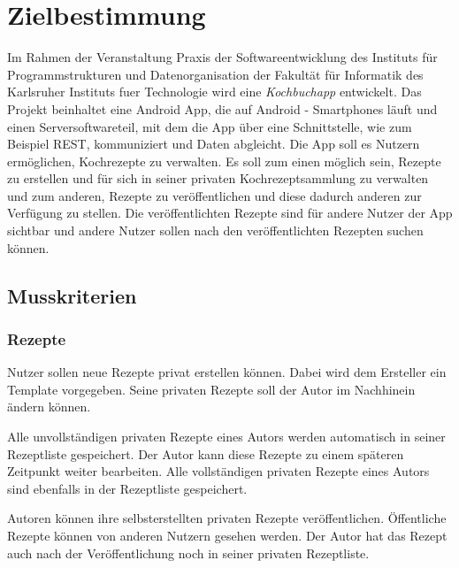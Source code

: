 \chapter{Zielbestimmung}	
	Im Rahmen der Veranstaltung \glqq Praxis der Softwareentwicklung\grqq{} des  Instituts für Programmstrukturen und Datenorganisation der Fakultät für Informatik des Karlsruher Instituts fuer Technologie wird eine \textit{Kochbuchapp} entwickelt. Das Projekt beinhaltet eine \gls{Android} App, die auf \gls{Android} - Smartphones läuft und einen Serversoftwareteil, mit dem die App über eine Schnittstelle, wie zum Beispiel \gls{REST}, kommuniziert und Daten abgleicht. Die App soll es Nutzern ermöglichen, Kochrezepte zu verwalten. Es soll zum einen möglich sein, Rezepte zu erstellen und für sich in seiner privaten Kochrezeptsammlung  zu verwalten und zum anderen, Rezepte zu veröffentlichen und diese dadurch anderen zur Verfügung zu stellen. Die veröffentlichten Rezepte sind für andere \gls{Nutzer} der App sichtbar und andere \gls{Nutzer} sollen nach den veröffentlichten Rezepten suchen können.


\section{Musskriterien}


\subsection{Rezepte}

 \gls{Nutzer} sollen neue Rezepte privat erstellen können. Dabei wird dem Ersteller ein \Gls{Template} vorgegeben. Seine privaten Rezepte soll der \gls{Autor} im Nachhinein ändern können. 

Alle unvollständigen privaten Rezepte eines Autors werden automatisch in seiner \gls{Rezeptliste} gespeichert. Der Autor kann diese Rezepte zu einem späteren Zeitpunkt weiter bearbeiten. Alle vollständigen privaten Rezepte eines Autors sind ebenfalls in der \gls{Rezeptliste} gespeichert.

Autoren können ihre selbsterstellten privaten Rezepte veröffentlichen. Öffentliche Rezepte können von anderen Nutzern gesehen werden. Der Autor hat das Rezept auch nach der Veröffentlichung noch in seiner privaten \gls{Rezeptliste}.

